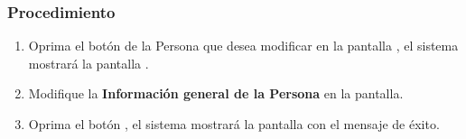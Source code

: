 \subsubsection{Procedimiento}
\begin{enumerate}
	\item Oprima el botón \btnEditar de la Persona que desea modificar en la pantalla , el sistema mostrará la pantalla . 

	
	\item Modifique la \textbf{Información general de la Persona} en la pantalla.
	
	\item Oprima el botón , el sistema mostrará la pantalla  con el mensaje de éxito.
\end{enumerate}

